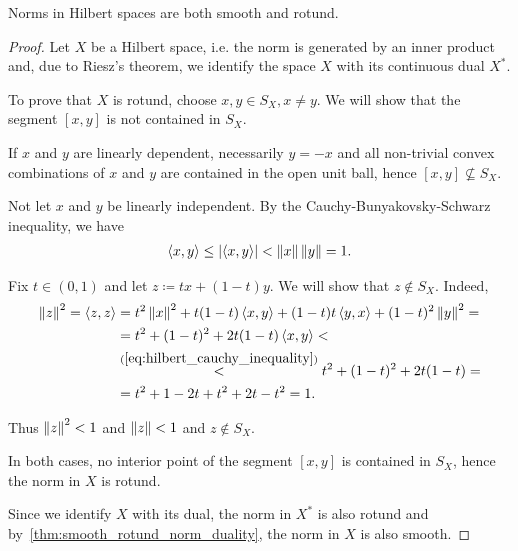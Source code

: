 \begin{proposition}\label{thm:hilbert_space_smooth_rotund}\cite[exercise 2.37(c)]{Phelps1993}
  Norms in Hilbert spaces are both smooth and rotund.
\end{proposition}
\begin{proof}
  Let \( X \) be a Hilbert space, i.e. the norm is generated by an inner product and, due to Riesz's theorem, we identify the space \( X \) with its continuous dual \( X^* \).

  To prove that \( X \) is rotund, choose \( x, y \in S_X, x \neq y \). We will show that the segment \( [x, y] \) is not contained in \( S_X \).

  If \( x \) and \( y \) are linearly dependent, necessarily \( y = -x \) and all non-trivial convex combinations of \( x \) and \( y \) are contained in the open unit ball, hence \( [x, y] \not\subseteq S_X \).

  Not let \( x \) and \( y \) be linearly independent. By the Cauchy-Bunyakovsky-Schwarz inequality, we have
  \begin{align}\label{eq:hilbert_cauchy_inequality}
    \left\langle x, y \right\rangle \leq \left\vert \left\langle x, y \right\rangle \right\vert < \left\Vert x \right\Vert \left\Vert y \right\Vert = 1.
  \end{align}

  Fix \( t \in (0, 1) \) and let \( z \coloneqq tx + (1-t)y \). We will show that \( z \not\in S_X \). Indeed,
  \begin{align*}
    \left\Vert z \right\Vert^2
    =
    \left\langle z, z \right\rangle
    &=
    t^2 \left\Vert x \right\Vert^2 + t(1-t) \left\langle x, y \right\rangle + (1-t) t \left\langle y, x \right\rangle + (1-t)^2 \left\Vert y \right\Vert^2
    = \\ &=
    t^2 + (1-t)^2 + 2 t(1-t) \left\langle x, y \right\rangle
    < \\ &\overset {(\ref{eq:hilbert_cauchy_inequality})} <
    t^2 + (1-t)^2 + 2 t(1-t)
    = \\ &=
    t^2 + 1 - 2t + t^2 + 2t - t^2
    =
    1.
  \end{align*}

  Thus \( \left\Vert z \right\Vert^2 < 1 \) and \( \left\Vert z \right\Vert < 1 \) and \( z \not\in S_X \).

  In both cases, no interior point of the segment \( [x, y] \) is contained in \( S_X \), hence the norm in \( X \) is rotund.

  Since we identify \( X \) with its dual, the norm in \( X^* \) is also rotund and by~\cref{thm:smooth_rotund_norm_duality}, the norm in \( X \) is also smooth.
\end{proof}

